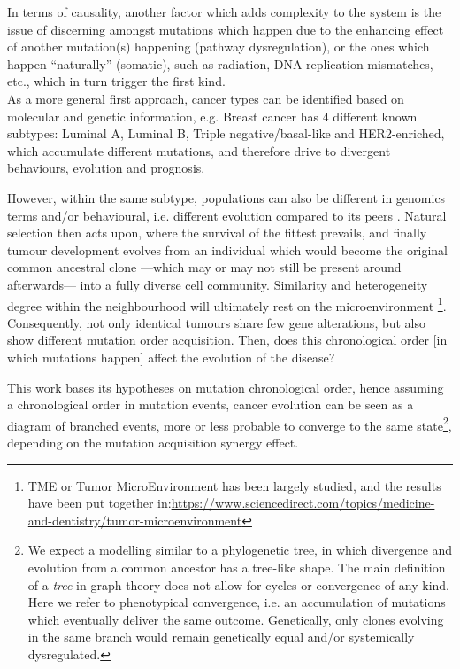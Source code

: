In terms of causality, another factor which adds complexity to the system is the issue of discerning amongst mutations which happen due to the enhancing effect of another mutation(s) happening (pathway dysregulation), or the ones which happen “naturally” (somatic), such as radiation, DNA replication mismatches, etc., which in turn trigger the first kind.
\\

As a more general first approach, cancer types can be identified based on molecular and genetic information, e.g. Breast cancer has 4 different known subtypes: Luminal A, Luminal B, Triple negative/basal-like and HER2-enriched, which accumulate different mutations, and therefore drive to divergent behaviours, evolution and prognosis.

However, within the same subtype, populations can also be different in genomics terms and/or behavioural, i.e. different evolution compared to its peers \cite{Melo2013CancerView} \cite{Kent2017OrderEvolution}. Natural selection then acts upon, where the survival of the fittest prevails, and finally tumour development evolves from an individual which would become the original common ancestral clone —which may or may not still be present around afterwards— into a fully diverse cell community. Similarity and heterogeneity degree within the neighbourhood will ultimately rest on the microenvironment \footnote{TME or Tumor MicroEnvironment has been largely studied, and the results have been put together in:\url{https://www.sciencedirect.com/topics/medicine-and-dentistry/tumor-microenvironment}}.
\\

Consequently, not only identical tumours share few gene alterations, but also show different mutation order acquisition. Then, does this chronological order [in which mutations happen] affect the evolution of the disease?

This work bases its hypotheses on mutation chronological order, hence assuming a chronological order in mutation events, cancer evolution can be seen as a diagram of branched events, more or less probable to converge to the same state\footnote{We expect a modelling similar to a phylogenetic tree, in which divergence and evolution from a common ancestor has a tree-like shape. The main definition of a \emph{tree} in graph theory does not allow for cycles or convergence of any kind. Here we refer to phenotypical convergence, i.e. an accumulation of mutations which eventually deliver the same outcome. Genetically, only clones evolving in the same branch would remain genetically equal and/or systemically dysregulated.}, depending on the mutation acquisition synergy effect.
\\

